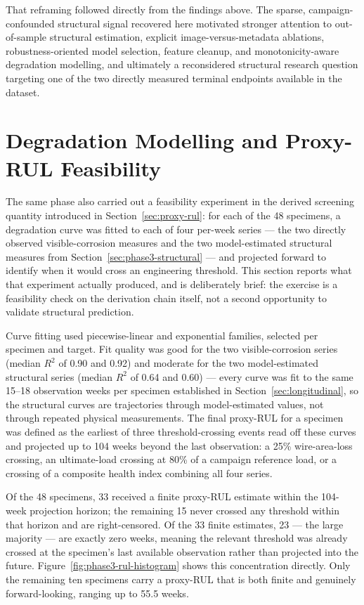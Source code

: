 That reframing followed directly from the findings above. The sparse,
campaign-confounded structural signal recovered here motivated stronger
attention to out-of-sample structural estimation, explicit
image-versus-metadata ablations, robustness-oriented model selection,
feature cleanup, and monotonicity-aware degradation modelling, and
ultimately a reconsidered structural research question targeting one of
the two directly measured terminal endpoints available in the dataset.

\section{Degradation Modelling and Proxy-RUL Feasibility}
\label{sec:phase3-degradation}

The same phase also carried out a feasibility experiment in the derived
screening quantity introduced in Section~\ref{sec:proxy-rul}: for each of the
48 specimens, a degradation curve was fitted to each of four per-week
series — the two directly observed visible-corrosion measures and the two
model-estimated structural measures from Section~\ref{sec:phase3-structural}
— and projected forward to identify when it would cross an engineering
threshold. This section reports what that experiment actually produced, and
is deliberately brief: the exercise is a feasibility check on the
derivation chain itself, not a second opportunity to validate structural
prediction.

Curve fitting used piecewise-linear and exponential families, selected per
specimen and target. Fit quality was good for the two visible-corrosion
series (median $R^2$ of 0.90 and 0.92) and moderate for the two
model-estimated structural series (median $R^2$ of 0.64 and 0.60) — every
curve was fit to the same 15–18 observation weeks per specimen established
in Section~\ref{sec:longitudinal}, so the structural curves are trajectories
through model-estimated values, not through repeated physical
measurements. The final proxy-RUL for a specimen was defined as the
earliest of three threshold-crossing events read off these curves and
projected up to 104 weeks beyond the last observation: a 25\% wire-area-loss
crossing, an ultimate-load crossing at 80\% of a campaign reference load, or
a crossing of a composite health index combining all four series.

Of the 48 specimens, 33 received a finite proxy-RUL estimate within the
104-week projection horizon; the remaining 15 never crossed any threshold
within that horizon and are right-censored. Of the 33 finite estimates,
23 — the large majority — are exactly zero weeks, meaning the relevant
threshold was already crossed at the specimen's last available observation
rather than projected into the future. Figure~\ref{fig:phase3-rul-histogram}
shows this concentration directly. Only the remaining ten specimens carry a
proxy-RUL that is both finite and genuinely forward-looking, ranging up to
55.5 weeks.

